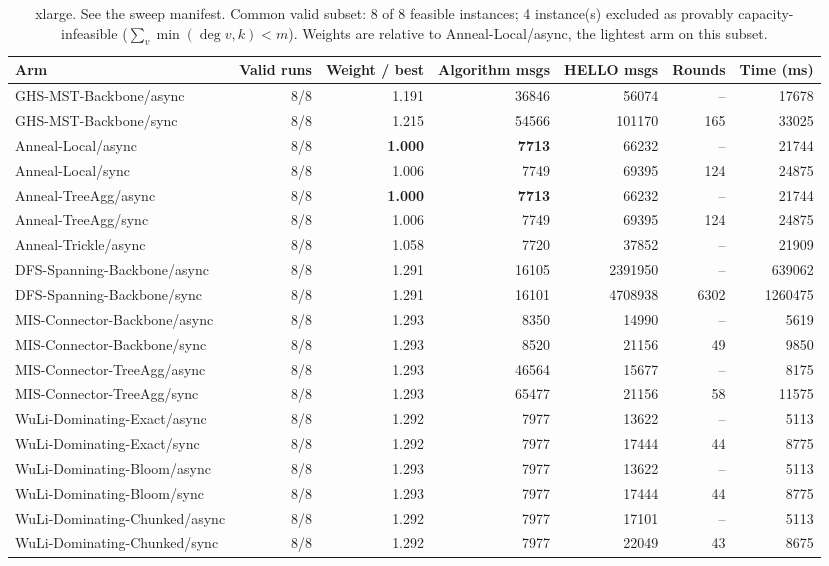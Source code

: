 \begin{table}[tb]
\centering
\caption{xlarge. See the sweep manifest. Common valid subset: 8 of 8 feasible instances; 4 instance(s) excluded as provably capacity-infeasible ($\sum_v \min(\deg v, k) < m$). Weights are relative to Anneal-Local/async, the lightest arm on this subset.}
\label{tab:cmp-xlarge}
\begin{tabular}{lrrrrrr}
\toprule
Arm & Valid runs & Weight / best & Algorithm msgs & HELLO msgs & Rounds & Time (ms) \\
\midrule
GHS-MST-Backbone/async & 8/8 & 1.191 & 36846 & 56074 & -- & 17678 \\
GHS-MST-Backbone/sync & 8/8 & 1.215 & 54566 & 101170 & 165 & 33025 \\
Anneal-Local/async & 8/8 & \textbf{1.000} & \textbf{7713} & 66232 & -- & 21744 \\
Anneal-Local/sync & 8/8 & 1.006 & 7749 & 69395 & 124 & 24875 \\
Anneal-TreeAgg/async & 8/8 & \textbf{1.000} & \textbf{7713} & 66232 & -- & 21744 \\
Anneal-TreeAgg/sync & 8/8 & 1.006 & 7749 & 69395 & 124 & 24875 \\
Anneal-Trickle/async & 8/8 & 1.058 & 7720 & 37852 & -- & 21909 \\
DFS-Spanning-Backbone/async & 8/8 & 1.291 & 16105 & 2391950 & -- & 639062 \\
DFS-Spanning-Backbone/sync & 8/8 & 1.291 & 16101 & 4708938 & 6302 & 1260475 \\
MIS-Connector-Backbone/async & 8/8 & 1.293 & 8350 & 14990 & -- & 5619 \\
MIS-Connector-Backbone/sync & 8/8 & 1.293 & 8520 & 21156 & 49 & 9850 \\
MIS-Connector-TreeAgg/async & 8/8 & 1.293 & 46564 & 15677 & -- & 8175 \\
MIS-Connector-TreeAgg/sync & 8/8 & 1.293 & 65477 & 21156 & 58 & 11575 \\
WuLi-Dominating-Exact/async & 8/8 & 1.292 & 7977 & 13622 & -- & 5113 \\
WuLi-Dominating-Exact/sync & 8/8 & 1.292 & 7977 & 17444 & 44 & 8775 \\
WuLi-Dominating-Bloom/async & 8/8 & 1.293 & 7977 & 13622 & -- & 5113 \\
WuLi-Dominating-Bloom/sync & 8/8 & 1.293 & 7977 & 17444 & 44 & 8775 \\
WuLi-Dominating-Chunked/async & 8/8 & 1.292 & 7977 & 17101 & -- & 5113 \\
WuLi-Dominating-Chunked/sync & 8/8 & 1.292 & 7977 & 22049 & 43 & 8675 \\

\end{tabular}
\end{table}
